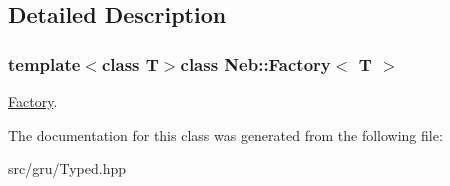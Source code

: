 \subsection{\-Detailed \-Description}
\subsubsection*{template$<$class T$>$class Neb\-::\-Factory$<$ T $>$}

\hyperlink{classNeb_1_1Factory}{\-Factory}. 

\-The documentation for this class was generated from the following file\-:\begin{DoxyCompactItemize}
\item 
src/gru/\-Typed.\-hpp\end{DoxyCompactItemize}
